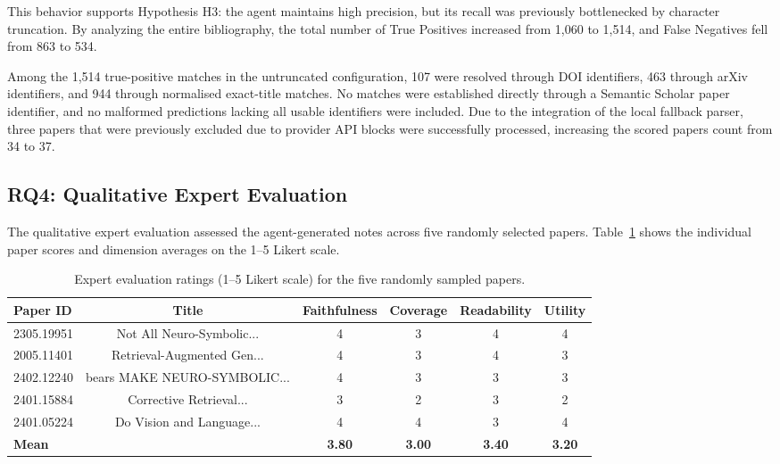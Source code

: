\documentclass[runningheads]{llncs}
\begin{document}
This behavior supports Hypothesis H3: the agent maintains high precision, but its recall was previously bottlenecked by character truncation. By analyzing the entire bibliography, the total number of True Positives increased from 1,060 to 1,514, and False Negatives fell from 863 to 534.

Among the 1,514 true-positive matches in the untruncated configuration, 107 were resolved through DOI identifiers, 463 through arXiv identifiers, and 944 through normalised exact-title matches. No matches were established directly through a Semantic Scholar paper identifier, and no malformed predictions lacking all usable identifiers were included. Due to the integration of the local fallback parser, three papers that were previously excluded due to provider API blocks were successfully processed, increasing the scored papers count from 34 to 37.

\subsection{RQ4: Qualitative Expert Evaluation}
\label{sec:rq4_results}

The qualitative expert evaluation assessed the agent-generated notes across five randomly selected papers. Table~\ref{tab:rq4_results} shows the individual paper scores and dimension averages on the 1--5 Likert scale.

\begin{table}[!htbp]
\centering
\caption{Expert evaluation ratings (1--5 Likert scale) for the five randomly sampled papers.}
\label{tab:rq4_results}
\begin{tabular}{lccccc}
\toprule
\textbf{Paper ID} & \textbf{Title} & \textbf{Faithfulness} & \textbf{Coverage} & \textbf{Readability} & \textbf{Utility} \\
\midrule
2305.19951 & Not All Neuro-Symbolic... & 4 & 3 & 4 & 4 \\
2005.11401 & Retrieval-Augmented Gen... & 4 & 3 & 4 & 3 \\
2402.12240 & bears MAKE NEURO-SYMBOLIC... & 4 & 3 & 3 & 3 \\
2401.15884 & Corrective Retrieval... & 3 & 2 & 3 & 2 \\
2401.05224 & Do Vision and Language... & 4 & 4 & 3 & 4 \\
\midrule
\textbf{Mean} & & \textbf{3.80} & \textbf{3.00} & \textbf{3.40} & \textbf{3.20} \\
\bottomrule
\end{tabular}
\end{table}
\end{document}

